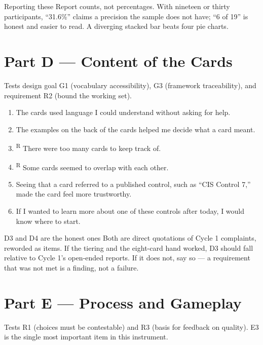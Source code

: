\documentclass[11pt,letterpaper]{article}
\newcommand{\R}{\textsuperscript{R}}
\begin{document}
\begin{note}{Reporting these}
Report counts, not percentages. With nineteen or thirty participants,
``31.6\%'' claims a precision the sample does not have; ``6 of 19'' is honest and
easier to read. A diverging stacked bar beats four pie charts.
\end{note}

\section{Part D --- Content of the Cards}

Tests design goal G1 (vocabulary accessibility), G3 (framework traceability),
and requirement R2 (bound the working set).

\begin{enumerate}[label=D\arabic*.]
\item The cards used language I could understand without asking for help.
\item The examples on the back of the cards helped me decide what a card meant.
\item\R{} There were too many cards to keep track of.
\item\R{} Some cards seemed to overlap with each other.
\item Seeing that a card referred to a published control, such as ``CIS Control
7,'' made the card feel more trustworthy.
\item If I wanted to learn more about one of these controls after today, I would
know where to start.
\end{enumerate}

\begin{note}{D3 and D4 are the honest ones}
Both are direct quotations of Cycle 1 complaints, reworded as items. If the
tiering and the eight-card hand worked, D3 should fall relative to Cycle 1's
open-ended reports. If it does not, say so --- a requirement that was not met is
a finding, not a failure.
\end{note}

\section{Part E --- Process and Gameplay}

Tests R1 (choices must be contestable) and R3 (basis for feedback on quality).
E3 is the single most important item in this instrument.
\end{document}
